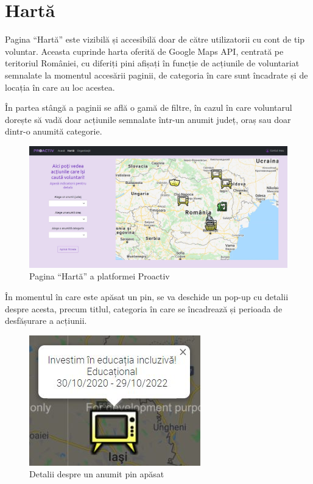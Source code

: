 \documentclass[12pt,a4paper]{report}
\begin{document}
\section{Hartă}
\par
Pagina “Hartă” este vizibilă și accesibilă doar de către utilizatorii cu cont de tip voluntar. Aceasta cuprinde harta oferită de Google Maps API, centrată pe teritoriul României, cu diferiți pini afișați în funcție de acțiunile de voluntariat semnalate la momentul accesării paginii, de categoria în care sunt încadrate și de locația în care au loc acestea.
\\\par
În partea stângă a paginii se află o gamă de filtre, în cazul în care voluntarul dorește să vadă doar acțiunile semnalate într-un anumit județ, oraș sau doar dintr-o anumită categorie.
\\
\begin{figure}[H]
\centering
  \includegraphics[width=1\linewidth]{./imagini/harta.jpg}
  \caption{Pagina “Hartă” a platformei Proactiv}
\end{figure}

\par
În momentul în care este apăsat un pin, se va deschide un pop-up cu detalii despre acesta, precum titlul, categoria în care se încadrează și perioada de desfășurare a acțiunii.
\\
\begin{figure}[H]
\centering
  \includegraphics[width=0.4\linewidth]{./imagini/pin.jpg}
  \caption{Detalii despre un anumit pin apăsat}
\end{figure}
\end{document}

